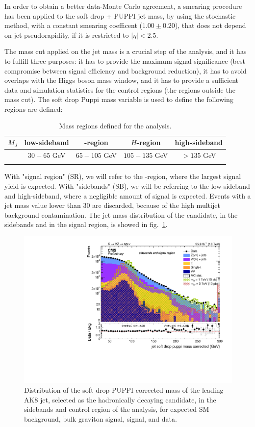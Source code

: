 \noindent In order to obtain a better data-Monte Carlo agreement, a smearing procedure has been applied to the soft drop + PUPPI jet mass, by using the stochastic method, with a constant smearing coefficent ($1.00 \pm 0.20$), that does not depend on jet pseudorapidity, if it is restricted to $|\eta|<2.5$.

\vspace*{1\baselineskip}

\noindent The mass cut applied on the jet mass is a crucial step of the analysis, and it has to fulfill three purposes: it has to provide the maximum signal significance (best compromise between signal efficiency and background reduction), it has to avoid overlaps with the Higgs boson mass window, and it has to provide a sufficient data and simulation statistics for the control regions (the regions outside the mass cut). The soft drop Puppi mass variable is used to define the following regions are defined:

\begin{table}[!htb]
  \begin{center}
\caption{Mass regions defined for the analysis.\label{tab:massregions}}
  \begin{tabular}{c|cccc}
 \hline
 $M_{J}$ & low-sideband & \V-region & $H$-region & high-sideband \\
 \hline
         & $30-65$ GeV & $65-105$ GeV & $105-135$ GeV & $> 135$ GeV\\ 
 \hline
 \label{tab:SR-SB}
 \end{tabular}
 \end{center}
\end{table}

\noindent With "signal region" (SR), we will refer to the \V-region, where the largest signal yield is expected. With "sidebands" (SB), we will be referring to the low-sideband and high-sideband, where a negligible amount of signal is expected. Events with a jet mass value lower than 30 \GeV are discarded, because of the high multijet background contamination. The jet mass distribution of the \V candidate, in the sidebands and in the signal region, is showed in fig.~\ref{fig:mj_paper}.

\begin{figure}[!htb]
  \begin{center}
    \includegraphics[width=.495\textwidth]{figures/FatJet1_softdropPuppiMassCorr.pdf}
  \end{center}
  \caption{Distribution of the soft drop PUPPI corrected mass of the leading AK8 jet, selected as the hadronically decaying \V candidate, in the sidebands and control region of the analysis, for expected SM background, bulk graviton signal, \Wp signal, and data.}
  \label{fig:mj_paper}
\end{figure}


